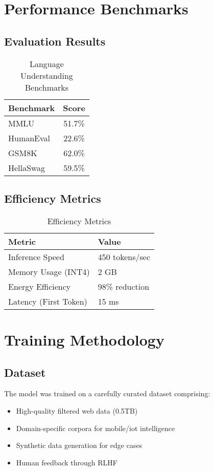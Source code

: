 \documentclass[11pt,a4paper]{article}
\begin{document}
\section{Performance Benchmarks}

\subsection{Evaluation Results}


\begin{table}[H]
\centering
\begin{tabular}{lc}
\toprule
\textbf{Benchmark} & \textbf{Score} \\
\midrule
MMLU & 51.7\% \\
HumanEval & 22.6\% \\
GSM8K & 62.0\% \\
HellaSwag & 59.5\% \\
\bottomrule
\end{tabular}
\caption{Language Understanding Benchmarks}
\end{table}

\subsection{Efficiency Metrics}

\begin{table}[H]
\centering
\begin{tabular}{ll}
\toprule
\textbf{Metric} & \textbf{Value} \\
\midrule
Inference Speed & 450 tokens/sec \\
Memory Usage (INT4) & 2 GB \\
Energy Efficiency & 98\% reduction \\
Latency (First Token) & 15 ms \\
\bottomrule
\end{tabular}
\caption{Efficiency Metrics}
\end{table}

\section{Training Methodology}

\subsection{Dataset}
The model was trained on a carefully curated dataset comprising:
\begin{itemize}
    \item High-quality filtered web data (0.5TB)
    \item Domain-specific corpora for mobile/iot intelligence
    \item Synthetic data generation for edge cases
    \item Human feedback through RLHF
\end{itemize}
\end{document}
